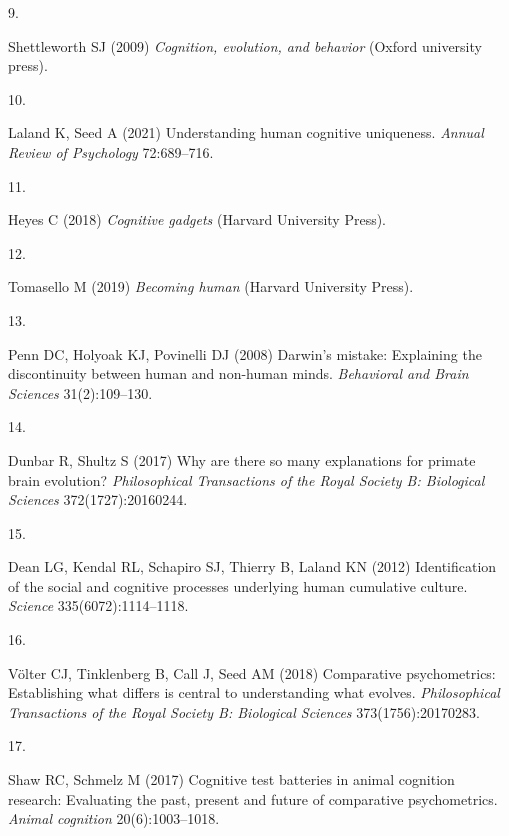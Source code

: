 \documentclass[
  man,floatsintext]{apa6}
\newlength{\cslhangindent}
\newlength{\csllabelwidth}
\newlength{\cslentryspacingunit} %
\newenvironment{CSLReferences}[2] %
 {%
  \setlength{\parindent}{0pt}
  \ifodd #1
  \let\oldpar\par
  \def\par{\hangindent=\cslhangindent\oldpar}
  \fi
  \setlength{\parskip}{#2\cslentryspacingunit}
 }%
 {}
\newcommand{\CSLLeftMargin}[1]{\parbox[t]{\csllabelwidth}{#1}}
\newcommand{\CSLRightInline}[1]{\parbox[t]{\linewidth - \csllabelwidth}{#1}\break}
\begin{document}
\begin{CSLReferences}{0}{0}
\leavevmode{}%
\CSLLeftMargin{9. }%
\CSLRightInline{Shettleworth SJ (2009) \emph{Cognition, evolution, and behavior} (Oxford university press).}

\leavevmode{}%
\CSLLeftMargin{10. }%
\CSLRightInline{Laland K, Seed A (2021) Understanding human cognitive uniqueness. \emph{Annual Review of Psychology} 72:689--716.}

\leavevmode{}%
\CSLLeftMargin{11. }%
\CSLRightInline{Heyes C (2018) \emph{Cognitive gadgets} (Harvard University Press).}

\leavevmode{}%
\CSLLeftMargin{12. }%
\CSLRightInline{Tomasello M (2019) \emph{Becoming human} (Harvard University Press).}

\leavevmode{}%
\CSLLeftMargin{13. }%
\CSLRightInline{Penn DC, Holyoak KJ, Povinelli DJ (2008) Darwin's mistake: Explaining the discontinuity between human and non-human minds. \emph{Behavioral and Brain Sciences} 31(2):109--130.}

\leavevmode{}%
\CSLLeftMargin{14. }%
\CSLRightInline{Dunbar R, Shultz S (2017) Why are there so many explanations for primate brain evolution? \emph{Philosophical Transactions of the Royal Society B: Biological Sciences} 372(1727):20160244.}

\leavevmode{}%
\CSLLeftMargin{15. }%
\CSLRightInline{Dean LG, Kendal RL, Schapiro SJ, Thierry B, Laland KN (2012) Identification of the social and cognitive processes underlying human cumulative culture. \emph{Science} 335(6072):1114--1118.}

\leavevmode{}%
\CSLLeftMargin{16. }%
\CSLRightInline{Völter CJ, Tinklenberg B, Call J, Seed AM (2018) Comparative psychometrics: Establishing what differs is central to understanding what evolves. \emph{Philosophical Transactions of the Royal Society B: Biological Sciences} 373(1756):20170283.}

\leavevmode{}%
\CSLLeftMargin{17. }%
\CSLRightInline{Shaw RC, Schmelz M (2017) Cognitive test batteries in animal cognition research: Evaluating the past, present and future of comparative psychometrics. \emph{Animal cognition} 20(6):1003--1018.}


\end{CSLReferences}
\end{document}
